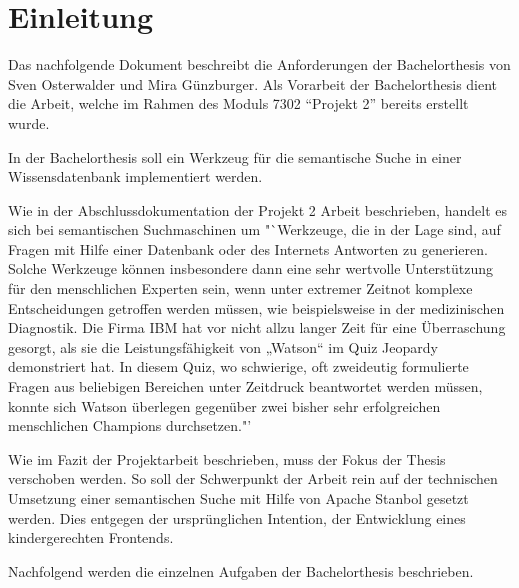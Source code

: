 \chapter{Einleitung}
\label{chap:einleitung}

Das nachfolgende Dokument beschreibt die Anforderungen der Bachelorthesis von Sven Osterwalder und Mira Günzburger. Als Vorarbeit der Bachelorthesis dient die Arbeit, welche im Rahmen des Moduls 7302 "`Projekt 2"' bereits erstellt wurde.

In der Bachelorthesis soll ein Werkzeug für die semantische Suche in einer Wissensdatenbank implementiert werden.

Wie in der Abschlussdokumentation der Projekt 2 Arbeit beschrieben, handelt es sich bei semantischen  Suchmaschinen um "`Werkzeuge, die in der Lage sind, auf Fragen mit Hilfe einer Datenbank oder des Internets Antworten zu generieren. Solche Werkzeuge können insbesondere dann eine sehr wertvolle Unterstützung für den menschlichen Experten sein, wenn unter extremer Zeitnot komplexe Entscheidungen getroffen werden müssen, wie beispielsweise in der medizinischen Diagnostik. Die Firma IBM hat vor nicht allzu langer Zeit für eine Überraschung gesorgt, als sie die Leistungsfähigkeit von „Watson“ im Quiz Jeopardy demonstriert hat. In diesem Quiz, wo schwierige, oft zweideutig formulierte Fragen aus beliebigen Bereichen unter Zeitdruck beantwortet werden müssen, konnte sich Watson überlegen gegenüber zwei bisher sehr erfolgreichen menschlichen Champions durchsetzen."'\cite{projekt2Doc}

Wie im Fazit der Projektarbeit beschrieben, muss der Fokus der Thesis verschoben werden. So soll der Schwerpunkt der Arbeit rein auf der technischen Umsetzung einer semantischen Suche mit Hilfe von Apache Stanbol gesetzt werden. Dies entgegen der ursprünglichen Intention, der Entwicklung eines kindergerechten Frontends.

Nachfolgend werden die einzelnen Aufgaben der Bachelorthesis beschrieben.

